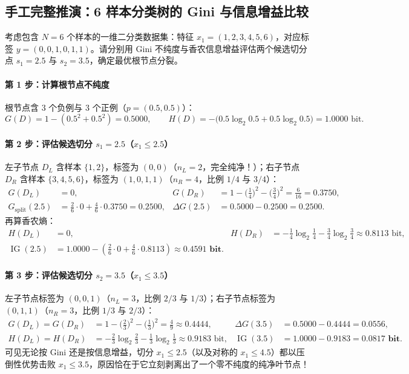 \subsection{手工完整推演：6 样本分类树的 Gini 与信息增益比较}

\begin{example}\label{ex:cart-hand}
考虑包含 $N = 6$ 个样本的一维二分类数据集：特征 $x_1 = (1, 2, 3, 4, 5, 6)$，对应标签 $y = (0, 0, 1, 0, 1, 1)$。请分别用 Gini 不纯度与香农信息增益评估两个候选切分点 $s_1 = 2.5$ 与 $s_2 = 3.5$，确定最优根节点分裂。
\end{example}

\paragraph{第 1 步：计算根节点不纯度}
根节点含 3 个负例与 3 个正例（$p = (0.5, 0.5)$）：
\[
  G(D) = 1 - (0.5^2 + 0.5^2) = 0.5000, \qquad
  H(D) = -\big(0.5\log_2 0.5 + 0.5\log_2 0.5\big) = 1.0000\text{ bit}.
\]

\paragraph{第 2 步：评估候选切分 $s_1 = 2.5$（$x_1 \le 2.5$）}
左子节点 $D_L$ 含样本 $\{1, 2\}$，标签为 $(0, 0)$（$n_L = 2$，完全纯净！）；右子节点 $D_R$ 含样本 $\{3, 4, 5, 6\}$，标签为 $(1, 0, 1, 1)$（$n_R = 4$，比例 $1/4$ 与 $3/4$）：
\begin{align*}
  G(D_L) &= 0, & G(D_R) &= 1 - \Big(\frac{1}{4}\Big)^2 - \Big(\frac{3}{4}\Big)^2 = \frac{6}{16} = 0.3750, \\
  G_{\mathrm{split}}(2.5) &= \frac{2}{6}\cdot 0 + \frac{4}{6}\cdot 0.3750 = \mathbf{0.2500}, &
  \Delta G(2.5) &= 0.5000 - 0.2500 = \mathbf{0.2500}.
\end{align*}
再算香农熵：
\begin{align*}
  H(D_L) &= 0, & H(D_R) &= -\frac{1}{4}\log_2\frac{1}{4} - \frac{3}{4}\log_2\frac{3}{4} \approx 0.8113\text{ bit}, \\
  \operatorname{IG}(2.5) &= 1.0000 - \left(\frac{2}{6}\cdot 0 + \frac{4}{6}\cdot 0.8113\right) \approx \mathbf{0.4591\text{ bit}}.
\end{align*}

\paragraph{第 3 步：评估候选切分 $s_2 = 3.5$（$x_1 \le 3.5$）}
左子节点标签为 $(0, 0, 1)$（$n_L = 3$，比例 $2/3$ 与 $1/3$）；右子节点标签为 $(0, 1, 1)$（$n_R = 3$，比例 $1/3$ 与 $2/3$）：
\begin{align*}
  G(D_L) = G(D_R) &= 1 - \Big(\frac{2}{3}\Big)^2 - \Big(\frac{1}{3}\Big)^2 = \frac{4}{9} \approx 0.4444, &
  \Delta G(3.5) &= 0.5000 - 0.4444 = \mathbf{0.0556}, \\
  H(D_L) = H(D_R) &= -\frac{2}{3}\log_2\frac{2}{3} - \frac{1}{3}\log_2\frac{1}{3} \approx 0.9183\text{ bit}, &
  \operatorname{IG}(3.5) &= 1.0000 - 0.9183 = \mathbf{0.0817\text{ bit}}.
\end{align*}
可见无论按 Gini 还是按信息增益，切分 $x_1 \le 2.5$（以及对称的 $x_1 \le 4.5$）都以压倒性优势击败 $x_1 \le 3.5$，原因恰在于它立刻剥离出了一个零不纯度的纯净叶节点！

